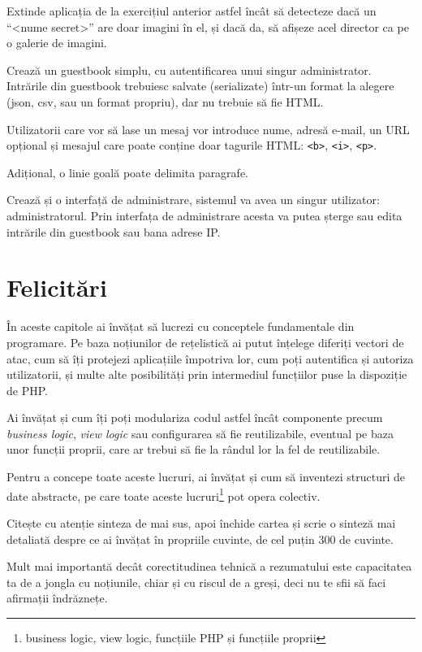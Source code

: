 \begin{Exercise}[title={Remote file storage cu galerie de imagini}]
Extinde aplicația de la exercițiul anterior astfel încât să detecteze
dacă un ``<nume secret>'' are doar imagini în el, și dacă
da, să afișeze acel director ca pe o galerie de imagini.
\end{Exercise}

\begin{Exercise}[title={Guestbook I},difficulty=2]
Crează un guestbook simplu, cu autentificarea unui singur
administrator. Intrările din guestbook trebuiesc salvate (serializate)
într-un format la alegere (json, csv, sau un format propriu), dar
nu trebuie să fie HTML.

Utilizatorii care vor să lase un mesaj vor introduce nume, adresă e-mail, un 
URL opțional și mesajul care poate conține doar tagurile HTML:
\texttt{<b>}, \texttt{<i>}, \texttt{<p>}.

Adițional, o linie goală poate delimita paragrafe.

Crează și o interfață de administrare, sistemul va avea un singur utilizator:
administratorul. Prin interfața de administrare acesta va putea șterge sau edita
intrările din guestbook sau bana adrese IP.
\end{Exercise}

\section{Felicitări}
În aceste capitole ai învățat să lucrezi cu conceptele fundamentale
din programare. Pe baza noțiunilor de rețelistică ai putut înțelege
diferiți vectori de atac, cum să îți protejezi aplicațiile împotriva
lor, cum poți autentifica și autoriza utilizatorii, și multe
alte posibilități prin intermediul funcțiilor puse la dispoziție de
PHP.

Ai învățat și cum îți poți modulariza codul astfel încât componente
precum \textit{business logic}, \textit{view logic} sau configurarea să fie
reutilizabile, eventual pe baza unor funcții proprii, care ar
trebui să fie la rândul lor la fel de reutilizabile.

Pentru a concepe toate aceste lucruri, ai învățat și cum să inventezi
structuri de date abstracte, pe care toate aceste
lucruri\footnote{business logic, view logic, funcțiile PHP și
funcțiile proprii} pot opera colectiv.

\begin{Exercise}[title={Recapitulare și sinteză}]
Citește cu atenție sinteza de mai sus, apoi închide cartea și scrie o
sinteză mai detaliată despre ce ai învățat în propriile cuvinte,
de cel puțin 300 de cuvinte.

Mult mai importantă dec\^at corectitudinea tehnică a rezumatului
este capacitatea ta de a jongla cu noțiunile, chiar și cu
riscul de a greși, deci nu te sfii să faci afirmații \^indrăznețe.
\end{Exercise}

